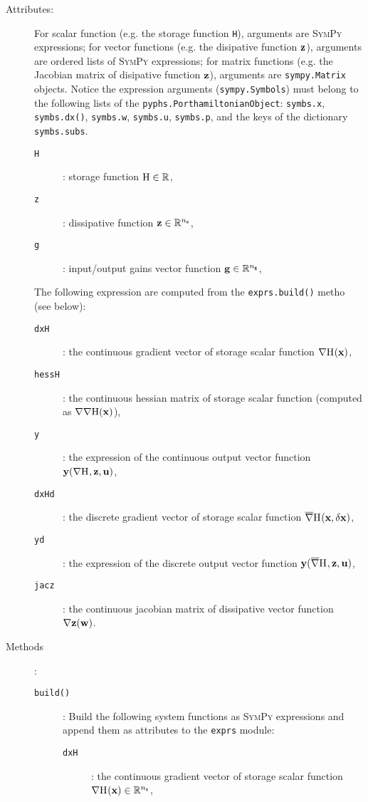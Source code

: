 \documentclass[10pt,a4paper]{article}
\begin{document}
\begin{description}
\begin{description}
%
\item[Attributes:] For scalar function (e.g. the storage function \texttt{H}), arguments are \textsc{SymPy} expressions; for vector functions (e.g. the disipative function ${\mathbf{z}}$), arguments are ordered lists of \textsc{SymPy} expressions; for matrix functions (e.g. the Jacobian matrix of disipative function ${\mathbf{z}}$), arguments are \texttt{sympy.Matrix} objects. Notice the expression arguments (\texttt{sympy.Symbols}) must belong to the following lists of the \texttt{pyphs.PorthamiltonianObject}: \texttt{symbs.x}, \texttt{symbs.dx()}, \texttt{symbs.w}, \texttt{symbs.u}, \texttt{symbs.p}, and the keys of the dictionary \texttt{symbs.subs}.
%
\begin{description}
\item[\texttt{H}]: storage function ${\mathrm{H}}\in\mathbb{R}$,
\item[\texttt{z}]: dissipative function ${\mathbf{z}}\in\mathbb{R}^{{n_{\mathtt{w}}}}$,
\item[\texttt{g}]: input/output gains vector function ${\mathbf{g}} \in \mathbb{R}^{n_{\mathtt{g}}}$,
\end{description}
%
The following expression are computed from the \texttt{exprs.build()} metho (see below):
%
\begin{description}
\item[\texttt{dxH}]: the continuous gradient vector of storage scalar function $\nabla{\mathrm{H}}_{\mathtt{}}({\mathbf{x}})$,
\item[\texttt{hessH}]: the continuous hessian matrix of storage scalar function (computed as $\nabla\nabla{\mathrm{H}}({\mathbf{x}})$),
\item[\texttt{y}]: the expression of the continuous output vector function ${\mathbf{y}}(\nabla{\mathrm{H}}_{\mathtt{}}, {\mathbf{z}}, {\mathbf{u}})$,
\item[\texttt{dxHd}]: the discrete gradient vector of storage scalar function $\overline{\nabla}{\mathrm{H}}_{\mathtt{}}({\mathbf{x}}, \delta{\mathbf{x}})$,
\item[\texttt{yd}]: the expression of the discrete output vector function ${\mathbf{y}}(\overline{\nabla}{\mathrm{H}}_{\mathtt{}}, {\mathbf{z}}, {\mathbf{u}})$,
\item[\texttt{jacz}]: the continuous jacobian matrix of dissipative vector function $\nabla{\mathbf{z}}({\mathbf{w}})$.
\end{description}
%
\item[Methods]:
%
\begin{description}
%
\item[\texttt{build()}]: Build the following system functions as \textsc{SymPy} expressions and append them as attributes to the \texttt{exprs} module:
%
\begin{description}
\item[\texttt{dxH}]: the continuous gradient vector of storage scalar function $\nabla{\mathrm{H}}_{\mathtt{}}({\mathbf{x}})\in\mathbb{R}^{{n_{\mathtt{x}}}}$,

\end{description}
\end{description}
\end{description}
\end{description}
\end{document}

